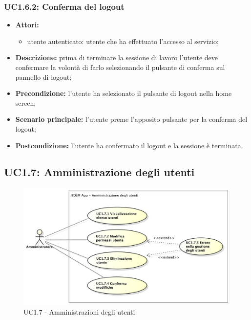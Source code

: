 \subsubsection{UC1.6.2: Conferma del logout}
\begin{itemize}
	\item \textbf{Attori:}
	\begin{itemize}
		\item utente autenticato: utente che ha effettuato l'accesso al servizio;
	\end{itemize}
	\item \textbf{Descrizione:} prima di terminare la sessione di lavoro l'utente deve confermare la volontà di farlo selezionando il pulsante di conferma sul pannello di logout;
	\item \textbf{Precondizione:} l'utente ha selezionato il pulsante di logout nella home screen;
	\item \textbf{Scenario principale:} l'utente preme l'apposito pulsante per la conferma del logout;
	\item \textbf{Postcondizione:} l'utente ha confermato il logout e la sessione è terminata.
\end{itemize}

\pagebreak


\subsection{UC1.7: Amministrazione degli utenti}
\begin{figure}[!htbp]
	\centering
	\centerline{\includegraphics[scale=0.45]{./images/UC1_7.pdf}}
	\caption{UC1.7 - Amministrazioni degli utenti}
\end{figure}


